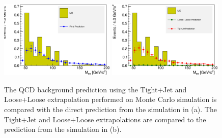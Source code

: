 \documentclass{cmspaper}
\begin{document}
\begin{figure}[htb]
\begin{center}
\includegraphics[width=0.49\textwidth]{MCBkgFakeRatePrediction_PhotonJets_FinalVsMC.eps}
\includegraphics[width=0.49\textwidth]{MCBkgFakeRatePrediction_PhotonJets_LooseLooseTightJetVsMC.eps}
   \caption{The QCD background prediction using the Tight+Jet and Loose+Loose extrapolation performed on Monte Carlo simulation is compared with the direct prediction from the simulation in (a). The Tight+Jet and Loose+Loose extrapolations are compared to the prediction from the simulation in (b). }
   \label{fig:ZeePhotonJetsBkgPrediction_MC}
\end{center}
\end{figure}
\end{document}
